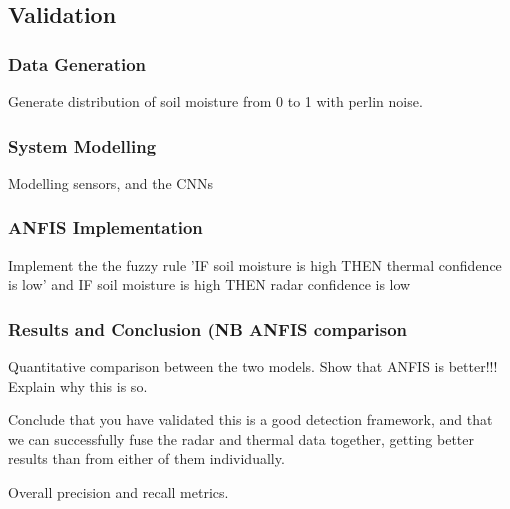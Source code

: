 \subsection{Validation} \label{compvis_anfisvalid}

    \subsubsection{Data Generation}
    
        Generate distribution of soil moisture from 0 to 1 with perlin noise.
        
    \subsubsection{System Modelling}
    
        Modelling sensors, and the CNNs
    
    \subsubsection{ANFIS Implementation}
        
        Implement the the fuzzy rule 'IF soil moisture is high THEN thermal confidence is low' and IF soil moisture is high THEN radar confidence is low
    
    \subsubsection{Results and Conclusion (NB ANFIS comparison}
    
        Quantitative comparison between the two models. Show that ANFIS is better!!! Explain why this is so.
        
        Conclude that you have validated this is a good detection framework, and that we can successfully fuse the radar and thermal data together, getting better results than from either of them individually.
        
        Overall precision and recall metrics.
    